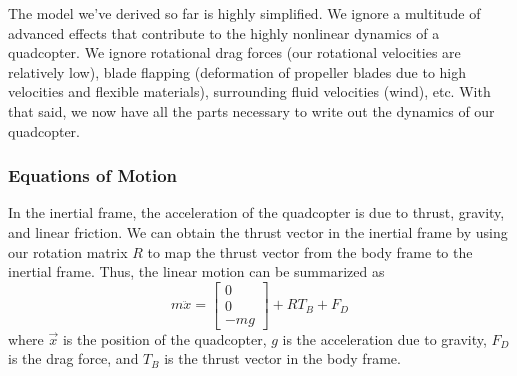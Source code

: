 \documentclass{article}
\newcommand\bmatr[1]{\begin{bmatrix} #1\end{bmatrix}}
\begin{document}
The model we've derived so far is highly simplified. We ignore a multitude of advanced effects that
contribute to the highly nonlinear dynamics of a quadcopter. We ignore rotational drag forces (our rotational velocities are relatively low),
blade flapping (deformation of propeller blades due to high velocities and flexible materials), surrounding fluid velocities (wind), etc.
With that said, we now have all the parts necessary to write out the dynamics of our quadcopter.

\subsubsection*{Equations of Motion}
In the inertial frame, the acceleration of the quadcopter is due to thrust, gravity, and linear
friction. We can obtain the thrust vector in the inertial frame by using our rotation matrix $R$ to
map the thrust vector from the body frame to the inertial frame. Thus, the linear motion can be
summarized as
\[m\ddot{x} = \bmatr{0 \\ 0 \\ -mg} + RT_B + F_D\]
where $\vec x$ is the position of the quadcopter, $g$ is the acceleration due to gravity, $F_D$ is
the drag force, and $T_B$ is the thrust vector in the body frame. 
%
\end{document}
